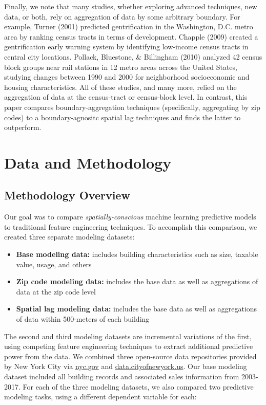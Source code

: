 \documentclass[12pt,]{article}
\providecommand{\tightlist}{%
  \setlength{\itemsep}{0pt}\setlength{\parskip}{0pt}}
\begin{document}
Finally, we note that many studies, whether exploring advanced
techniques, new data, or both, rely on aggregation of data by some
arbitrary boundary. For example, Turner (2001) predicted gentrification
in the Washington, D.C. metro area by ranking census tracts in terms of
development. Chapple (2009) created a gentrification early warning
system by identifying low-income census tracts in central city
locations. Pollack, Bluestone, \& Billingham (2010) analyzed 42 census
block groups near rail stations in 12 metro areas across the United
States, studying changes between 1990 and 2000 for neighborhood
socioeconomic and housing characteristics. All of these studies, and
many more, relied on the aggregation of data at the census-tract or
census-block level. In contrast, this paper compares
boundary-aggregation techniques (specifically, aggregating by zip codes)
to a boundary-agnositc spatial lag techniques and finds the latter to
outperform.

\hypertarget{data-and-methodology}{%
\section{Data and Methodology}\label{data-and-methodology}}

\hypertarget{methodology-overview}{%
\subsection{Methodology Overview}\label{methodology-overview}}

Our goal was to compare \emph{spatially-conscious} machine learning
predictive models to traditional feature engineering techniques. To
accomplish this comparison, we created three separate modeling datasets:

\begin{itemize}
\tightlist
\item
  \textbf{Base modeling data:} includes building characteristics such as
  size, taxable value, usage, and others
\item
  \textbf{Zip code modeling data:} includes the base data as well as
  aggregations of data at the zip code level
\item
  \textbf{Spatial lag modeling data:} includes the base data as well as
  aggregations of data within 500-meters of each building
\end{itemize}

\noindent The second and third modeling datasets are incremental
variations of the first, using competing feature engineering techniques
to extract additional predictive power from the data. We combined three
open-source data repositories provided by New York City via
\url{nyc.gov} and \url{data.cityofnewyork.us}. Our base modeling dataset
included all building records and associated sales information from
2003-2017. For each of the three modeling datasets, we also compared two
predictive modeling tasks, using a different dependent variable for
each:
\end{document}
